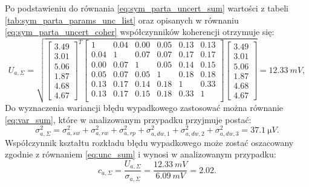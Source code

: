 Po podstawieniu do równania \eqref{eq:sym_parta_uncert_sum} wartości z tabeli \ref{tab:sym_parta_params_unc_list} oraz opisanych w równaniu \eqref{eq:sym_parta_uncert_coher} współczynników koherencji otrzymuje się:
\begin{equation}
U_{a,\Sigma} = \sqrt{
\begin{bmatrix}
3.49 \\ 3.01 \\ 5.06 \\ 1.87 \\ 4.68 \\ 4.67
\end{bmatrix}^{T}
\begin{bmatrix}
1    & 0.04 & 0.00 & 0.05 & 0.13 & 0.13 \\
0.04 & 1    & 0.07 & 0.07 & 0.17 & 0.17 \\
0.00 & 0.07 & 1    & 0.05 & 0.14 & 0.15 \\
0.05 & 0.07 & 0.05 & 1    & 0.18 & 0.18 \\
0.13 & 0.17 & 0.14 & 0.18 & 1    & 0.33 \\
0.13 & 0.17 & 0.15 & 0.18 & 0.33 & 1    \\
\end{bmatrix}
\begin{bmatrix}
3.49 \\ 3.01 \\ 5.06 \\ 1.87 \\ 4.68 \\ 4.67
\end{bmatrix}} = \qty{12.33}{mV}
\label{eq:sym_parta_uncert_value_a},
\end{equation}
Do wyznaczenia wariancji błędu wypadkowego zastosować można równanie \eqref{eq:var_sum}, które w analizowanym przypadku przyjmuje postać:
\begin{equation}
\sigma_{a,\Sigma}^{2} = \sigma_{a,sw}^{2} + \sigma_{a,rw}^{2} + \sigma_{a,rp}^{2} + \sigma_{a,dw,1}^{2} + \sigma_{a,dw,2}^{2} + \sigma_{a,dw,3}^{2} = \qty{37.1}{\micro V} \label{eq:sym_parta_var_sum}.
\end{equation}
Współczynnik kształtu rozkładu błędu wypadkowego może zostać oszacowany zgodnie z równaniem \eqref{eq:unc_sum} i wynosi w analizowanym przypadku:
\begin{equation}
c_{a,\Sigma} = \frac{U_{a,\Sigma}}{\sigma_{a,\Sigma}} = \frac{\qty{12.33}{mV}}{\qty{6.09}{mV}} = 2.02 \label{eq:sym_parta_uncert_factor}.
\end{equation}


